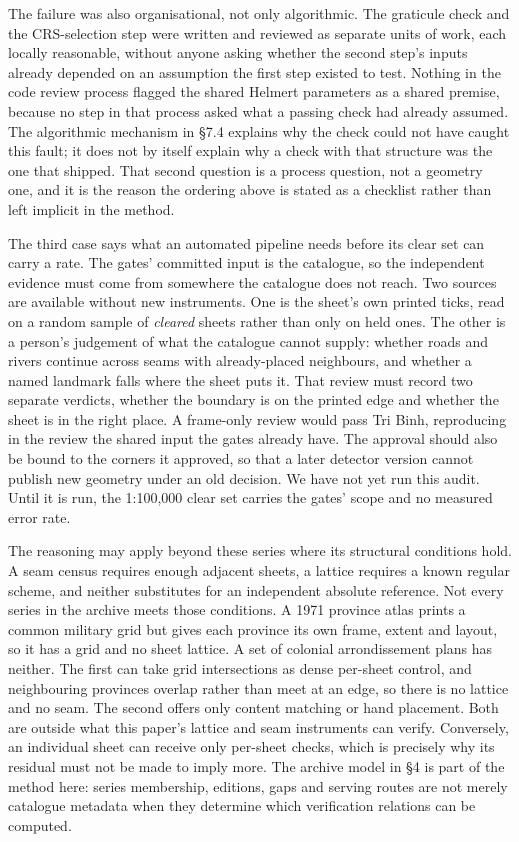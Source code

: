 \documentclass[11pt,a4paper]{article}
\begin{document}
The failure was also organisational, not only algorithmic. The graticule check and the CRS-selection step were written and reviewed as separate units of work, each locally reasonable, without anyone asking whether the second step's inputs already depended on an assumption the first step existed to test. Nothing in the code review process flagged the shared Helmert parameters as a shared premise, because no step in that process asked what a passing check had already assumed. The algorithmic mechanism in §7.4 explains why the check could not have caught this fault; it does not by itself explain why a check with that structure was the one that shipped. That second question is a process question, not a geometry one, and it is the reason the ordering above is stated as a checklist rather than left implicit in the method.

The third case says what an automated pipeline needs before its clear set can carry a rate. The gates' committed input is the catalogue, so the independent evidence must come from somewhere the catalogue does not reach. Two sources are available without new instruments. One is the sheet's own printed ticks, read on a random sample of \emph{cleared} sheets rather than only on held ones. The other is a person's judgement of what the catalogue cannot supply: whether roads and rivers continue across seams with already-placed neighbours, and whether a named landmark falls where the sheet puts it. That review must record two separate verdicts, whether the boundary is on the printed edge and whether the sheet is in the right place. A frame-only review would pass Tri Binh, reproducing in the review the shared input the gates already have. The approval should also be bound to the corners it approved, so that a later detector version cannot publish new geometry under an old decision. We have not yet run this audit. Until it is run, the 1:100,000 clear set carries the gates' scope and no measured error rate.

The reasoning may apply beyond these series where its structural conditions hold. A seam census requires enough adjacent sheets, a lattice requires a known regular scheme, and neither substitutes for an independent absolute reference. Not every series in the archive meets those conditions. A 1971 province atlas prints a common military grid but gives each province its own frame, extent and layout, so it has a grid and no sheet lattice. A set of colonial arrondissement plans has neither. The first can take grid intersections as dense per-sheet control, and neighbouring provinces overlap rather than meet at an edge, so there is no lattice and no seam. The second offers only content matching or hand placement. Both are outside what this paper's lattice and seam instruments can verify. Conversely, an individual sheet can receive only per-sheet checks, which is precisely why its residual must not be made to imply more. The archive model in §4 is part of the method here: series membership, editions, gaps and serving routes are not merely catalogue metadata when they determine which verification relations can be computed.
\end{document}
